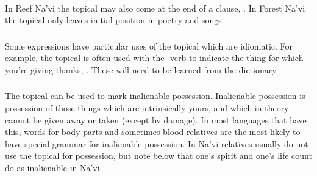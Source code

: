 
\paragraph{} 
In Reef Na'vi the topical may also come at the end of a
clause,  .  In Forest Na'vi the topical only leaves initial position in
poetry and songs.  \Omaticon

\subsubsection{} Some expressions have particular uses of the topical
which are idiomatic.  For example, the topical is often used with
the -verb   to indicate the thing for
which you're giving thanks,  .
These will need to be learned from the dictionary.

\subsubsection{}
\label{syn:topical:poss}
The topical can be used to mark inalienable possession.  Inalienable
possession is posses\-sion of those things which are intrinsically
yours, and which in theory cannot be given away or taken (except by
damage).  In most languages that have this, words for body parts and
sometimes blood relatives are the most likely to have special grammar
for inalienable possession.  In Na'vi relatives usually do not use the
topical for possession, but note below that one's spirit and one's
life count do as inalienable in Na'vi.

